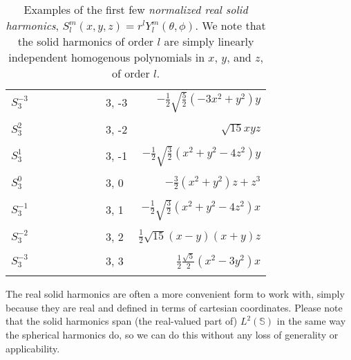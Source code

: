 \documentclass[../../master.tex]{subfiles}
\begin{document}
\begin{table}[p]
\begin{tabularx}{\textwidth}{l X  r}
$S_3^{-3}$    & \ \ \ \ \ \ \ \ \ \ \ \ 3, -3 & $\displaystyle -\frac{1}{2}\sqrt{\frac{5}{2}}(-3x^2+y^2)y$ \\
\\[-0.5em]
$S_3^2$       & \ \ \ \ \ \ \ \ \ \ \ \ 3, -2 & $\displaystyle \sqrt{15}xyz$ \\
\\[-0.5em]
$S_3^{1}$     & \ \ \ \ \ \ \ \ \ \ \ \ 3, -1 & $\displaystyle -\frac{1}{2}\sqrt{\frac{3}{2}}(x^2+y^2-4z^2)y$ \\
\\[-0.5em]
$S_3^0$       & \ \ \ \ \ \ \ \ \ \ \ \ 3, 0 & $\displaystyle -\frac{3}{2}(x^2+y^2)z+z^3$ \\
\\[-0.5em]
$S_3^{-1}$    & \ \ \ \ \ \ \ \ \ \ \ \ 3, 1 & $\displaystyle -\frac{1}{2}\sqrt{\frac{3}{2}}(x^2+y^2-4z^2)x$ \\
\\[-0.5em]
$S_3^{-2}$    & \ \ \ \ \ \ \ \ \ \ \ \ 3, 2 & $\displaystyle \frac{1}{2}\sqrt{15}(x-y)(x+y)z$ \\
\\[-0.5em]
$S_3^{-3}$    & \ \ \ \ \ \ \ \ \ \ \ \ 3, 3 & $\displaystyle \frac{1}{2}\frac{\sqrt{5}}{2}(x^2-3y^2)x$ \\
\\[-0.5em]
\hline
\end{tabularx}
\caption{Examples of the first few \emph{normalized real solid harmonics}, $S^m_l(x,y,z)=r^lY^m_l(\theta,\phi)$. We note that the solid harmonics of order $l$ are simply linearly independent homogenous polynomials in $x$, $y$, and $z$, of order $l$.  \label{tab:solidharmonics}}
\end{table}

The real solid harmonics are often a more convenient form to work with, simply because they are real and defined in terms of cartesian coordinates. Please note that the solid harmonics span (the real-valued part of) $L^2(\mathbb{S})$ in the same way the spherical harmonics do, so we can do this without any loss of generality or applicability.
\end{document}

